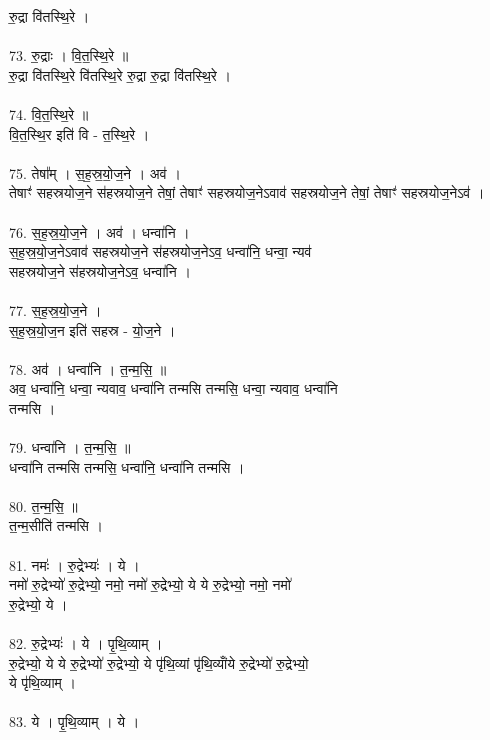 रु॒द्रा वि॑तस्थि॒रे ।\\
\\
73. रु॒द्राः । वि॒त॒स्थि॒रे ॥\\
रु॒द्रा वि॑तस्थि॒रे वि॑तस्थि॒रे रु॒द्रा रु॒द्रा वि॑तस्थि॒रे ।\\
\\
74. वि॒त॒स्थि॒रे ॥\\
वि॒त॒स्थि॒र इति॑ वि - त॒स्थि॒रे ।\\
\\
75. तेषा᳚म् । स॒ह॒स्र॒यो॒ज॒ने । अव॑ ।\\
तेषाꣳ॑ सहस्रयोज॒ने स॑हस्रयोज॒ने तेषां॒ तेषाꣳ॑ सहस्रयोज॒नेऽवाव॑ सहस्रयोज॒ने तेषां॒ तेषाꣳ॑ सहस्रयोज॒नेऽव॑ ।\\
\\
76. स॒ह॒स्र॒यो॒ज॒ने । अव॑ । धन्वा॑नि ।\\
स॒ह॒स्र॒यो॒ज॒नेऽवाव॑ सहस्रयोज॒ने स॑हस्रयोज॒नेऽव॒ धन्वा॑नि॒ धन्वा॒ न्यव॑\\
सहस्रयोज॒ने स॑हस्रयोज॒नेऽव॒ धन्वा॑नि ।\\
\\
77. स॒ह॒स्र॒यो॒ज॒ने ।\\
स॒ह॒स्र॒यो॒ज॒न इति॑ सहस्र - यो॒ज॒ने ।\\
\\
78. अव॑ । धन्वा॑नि । त॒न्म॒सि॒ ॥\\
अव॒ धन्वा॑नि॒ धन्वा॒ न्यवाव॒ धन्वा॑नि तन्मसि तन्मसि॒ धन्वा॒ न्यवाव॒ धन्वा॑नि\\
तन्मसि ।\\
\\
79. धन्वा॑नि । त॒न्म॒सि॒ ॥\\
धन्वा॑नि तन्मसि तन्मसि॒ धन्वा॑नि॒ धन्वा॑नि तन्मसि ।\\
\\
80. त॒न्म॒सि॒ ॥\\
त॒न्म॒सीति॑ तन्मसि ।\\
\\
81. नमः॑ । रु॒द्रेभ्यः॑ । ये ।\\
नमो॑ रु॒द्रेभ्यो॑ रु॒द्रेभ्यो॒ नमो॒ नमो॑ रु॒द्रेभ्यो॒ ये ये रु॒द्रेभ्यो॒ नमो॒ नमो॑\\
रु॒द्रेभ्यो॒ ये ।\\
\\
82. रु॒द्रेभ्यः॑ । ये । पृ॒थि॒व्याम् ।\\
रु॒द्रेभ्यो॒ ये ये रु॒द्रेभ्यो॑ रु॒द्रेभ्यो॒ ये पृ॑थि॒व्यां पृ॑थि॒व्यांँये रु॒द्रेभ्यो॑ रु॒द्रेभ्यो॒\\
ये पृ॑थि॒व्याम् ।\\
\\
83. ये । पृ॒थि॒व्याम् । ये ।\\
